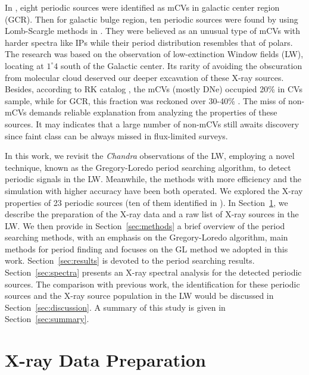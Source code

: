 \documentclass[fleqn,usenatbib]{mnras}
\begin{document}
In \citet{2003ApJ...599..465M}, eight periodic sources were identified as mCVs in galactic center region (GCR). Then for galactic bulge region, ten periodic sources were found by using Lomb-Scargle methods in \citep{2012ApJ...746..165H}. They were believed as an unusual type of mCVs with harder spectra like IPs while their period distribution resembles that of polars. The research was based on the observation of low-extinction Window fields (LW), locating at $1^{\circ}4$ south of the Galactic center. Its rarity of avoiding the obscuration from molecular cloud deserved our deeper excavation of these X-ray sources. 
Besides, according to RK catalog \citep{2003A&A...404..301R}, the mCVs (mostly DNe) occupied 20\% in CVs sample, while for GCR, this fraction was reckoned over 30-40\% \citep{2016ApJ...826..160H,2012ApJ...746..165H}. The miss of non-mCVs demands reliable explanation from analyzing the properties of these sources. It may indicates that a large number of non-mCVs still awaits discovery since faint class can be always missed in flux-limited surveys.

In this work, we revisit the {\it Chandra} observations of the LW, employing a novel technique, known as the Gregory-Loredo period searching algorithm, to detect periodic signals in the LW. Meanwhile, the methods with more efficiency and the simulation with higher accuracy have been both operated. 
We explored the X-ray properties of 23 periodic sources (ten of them identified in \citealt{2012ApJ...746..165H}). 
In Section~\ref{sec:obs}, we describe the preparation of the X-ray data and a raw list of X-ray sources in the LW.
We then provide in Section~\ref{sec:methods} a brief overview of the period searching methods, with an emphasis on the Gregory-Loredo algorithm, main methods for period finding and focuses on the GL method we adopted in this work. 
Section~\ref{sec:results} is devoted to the period searching results.
Section~\ref{sec:spectra} presents an X-ray spectral analysis for the detected periodic sources. 
The comparison with previous work, the identification for these periodic sources and the X-ray source population in the LW would be discussed in Section~\ref{sec:discussion}.
A summary of this study is given in Section~\ref{sec:summary}.

\section{X-ray Data Preparation} \label{sec:obs}
\end{document}
